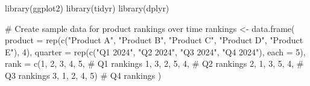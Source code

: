 \documentclass[
  letterpaper,
  DIV=11,
  numbers=noendperiod]{scrartcl}
\newenvironment{Shaded}{\begin{snugshade}}{\end{snugshade}}
\newcommand{\AttributeTok}[1]{\textcolor[rgb]{0.40,0.45,0.13}{#1}}
\newcommand{\CommentTok}[1]{\textcolor[rgb]{0.37,0.37,0.37}{#1}}
\newcommand{\DecValTok}[1]{\textcolor[rgb]{0.68,0.00,0.00}{#1}}
\newcommand{\FunctionTok}[1]{\textcolor[rgb]{0.28,0.35,0.67}{#1}}
\newcommand{\NormalTok}[1]{\textcolor[rgb]{0.00,0.23,0.31}{#1}}
\newcommand{\OtherTok}[1]{\textcolor[rgb]{0.00,0.23,0.31}{#1}}
\newcommand{\StringTok}[1]{\textcolor[rgb]{0.13,0.47,0.30}{#1}}
\begin{document}
\begin{Shaded}
\begin{Highlighting}[]
\FunctionTok{library}\NormalTok{(ggplot2)}
\FunctionTok{library}\NormalTok{(tidyr)}
\FunctionTok{library}\NormalTok{(dplyr)}

\CommentTok{\# Create sample data for product rankings over time}
\NormalTok{rankings }\OtherTok{\textless{}{-}} \FunctionTok{data.frame}\NormalTok{(}
  \AttributeTok{product =} \FunctionTok{rep}\NormalTok{(}\FunctionTok{c}\NormalTok{(}\StringTok{"Product A"}\NormalTok{, }\StringTok{"Product B"}\NormalTok{, }
                  \StringTok{"Product C"}\NormalTok{, }\StringTok{"Product D"}\NormalTok{, }\StringTok{"Product E"}\NormalTok{), }\DecValTok{4}\NormalTok{),}
  \AttributeTok{quarter =} \FunctionTok{rep}\NormalTok{(}\FunctionTok{c}\NormalTok{(}\StringTok{"Q1 2024"}\NormalTok{, }\StringTok{"Q2 2024"}\NormalTok{, }
                  \StringTok{"Q3 2024"}\NormalTok{, }\StringTok{"Q4 2024"}\NormalTok{), }\AttributeTok{each =} \DecValTok{5}\NormalTok{),}
  \AttributeTok{rank =} \FunctionTok{c}\NormalTok{(}\DecValTok{1}\NormalTok{, }\DecValTok{2}\NormalTok{, }\DecValTok{3}\NormalTok{, }\DecValTok{4}\NormalTok{, }\DecValTok{5}\NormalTok{,       }\CommentTok{\# Q1 rankings}
           \DecValTok{1}\NormalTok{, }\DecValTok{3}\NormalTok{, }\DecValTok{2}\NormalTok{, }\DecValTok{5}\NormalTok{, }\DecValTok{4}\NormalTok{,       }\CommentTok{\# Q2 rankings}
           \DecValTok{2}\NormalTok{, }\DecValTok{1}\NormalTok{, }\DecValTok{3}\NormalTok{, }\DecValTok{5}\NormalTok{, }\DecValTok{4}\NormalTok{,       }\CommentTok{\# Q3 rankings}
           \DecValTok{3}\NormalTok{, }\DecValTok{1}\NormalTok{, }\DecValTok{2}\NormalTok{, }\DecValTok{4}\NormalTok{, }\DecValTok{5}\NormalTok{)       }\CommentTok{\# Q4 rankings}
\NormalTok{)}


\end{Highlighting}
\end{Shaded}
\end{document}
